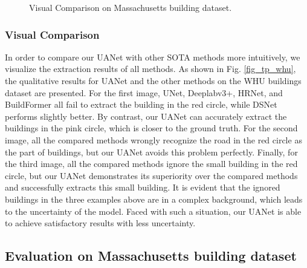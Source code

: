 \documentclass[lettersize,journal]{IEEEtran}
\begin{document}
\begin{figure*}
\centering
{}
\hfil
{}
\hfil
{}
\hfil
{}
\hfil
{}
\hfil
{}
\hfil
{}
\hfil
\caption{Visual Comparison on Massachusetts building dataset.}
\label{fig_tp_mass}
\vspace{-0.5em}
\end{figure*}

\subsubsection{Visual Comparison}

In order to compare our UANet with other SOTA methods more intuitively, we visualize the extraction results of all methods. As shown in Fig. \ref{fig_tp_whu}, the qualitative results for UANet and the other methods on the WHU buildings dataset are presented. For the first image, UNet, Deeplabv3+, HRNet, and BuildFormer all fail to extract the building in the red circle, while DSNet performs slightly better. By contrast, our UANet can accurately extract the buildings in the pink circle, which is closer to the ground truth. For the second image, all the compared methods wrongly recognize the road in the red circle as the part of buildings, but our UANet avoids this problem perfectly. Finally, for the third image, all the compared methods ignore the small building in the red circle, but our UANet demonstrates its superiority over the compared methods and successfully extracts this small building. It is evident that the ignored buildings in the three examples above are in a complex background, which leads to the uncertainty of the model. Faced with such a situation, our UANet is able to achieve satisfactory results with less uncertainty.

\subsection{Evaluation on Massachusetts building dataset}
\end{document}
